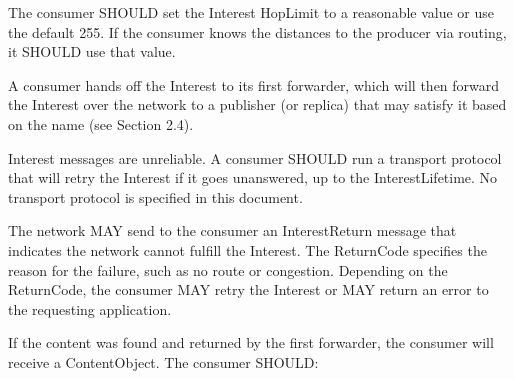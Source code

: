 \documentclass[12pt]{article}
\begin{document}
The consumer SHOULD set the Interest HopLimit to a reasonable value
or use the default 255.  If the consumer knows the distances to the
producer via routing, it SHOULD use that value.

A consumer hands off the Interest to its first forwarder, which will
then forward the Interest over the network to a publisher (or
replica) that may satisfy it based on the name (see Section 2.4).

Interest messages are unreliable.  A consumer SHOULD run a transport
protocol that will retry the Interest if it goes unanswered, up to
the InterestLifetime.  No transport protocol is specified in this
document.

The network MAY send to the consumer an InterestReturn message that
indicates the network cannot fulfill the Interest.  The ReturnCode
specifies the reason for the failure, such as no route or congestion.
Depending on the ReturnCode, the consumer MAY retry the Interest or
MAY return an error to the requesting application.

If the content was found and returned by the first forwarder, the
consumer will receive a ContentObject.  The consumer SHOULD:
\end{document}
